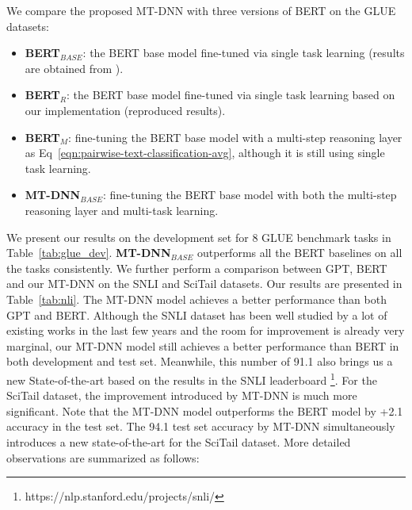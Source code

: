 \iffalse

We compare the proposed MT-DNN with three versions of BERT on the GLUE datasets:
\begin{itemize}
    \item \textbf{BERT}$_{BASE}$: the BERT base model fine-tuned via single task learning (results are obtained from \cite{bert2018}).
    \item \textbf{BERT}$_{R}$: the BERT base model fine-tuned via single task learning based on our implementation (reproduced results).
    \item \textbf{BERT}$_{M}$: fine-tuning the BERT base model with a multi-step reasoning layer as Eq~\ref{eqn:pairwise-text-classification-avg}, although it is still using single task learning.
    \item \textbf{MT-DNN}$_{BASE}$: fine-tuning the BERT base model with both the multi-step reasoning layer and multi-task learning.
\end{itemize}
We present our results on the development set for 8 GLUE benchmark tasks in Table~\ref{tab:glue_dev}. 
\textbf{MT-DNN}$_{BASE}$ outperforms all the BERT baselines on all the tasks consistently. %
We further perform a comparison between GPT, BERT and our MT-DNN on the SNLI and SciTail datasets. Our results are presented in Table~\ref{tab:nli}. The MT-DNN model achieves a better performance than both GPT and BERT. Although the SNLI dataset has been well studied by a lot of existing works in the last few years and the room for improvement is already very marginal, our MT-DNN model still achieves a better performance than BERT in both development and test set. Meanwhile, this number of 91.1 also brings us a new State-of-the-art based on the results in the SNLI leaderboard \footnote{https://nlp.stanford.edu/projects/snli/}.  For the SciTail dataset, the improvement introduced by MT-DNN is much more significant. Note that the MT-DNN model outperforms the BERT model by +2.1 accuracy in the test set. The 94.1 test set accuracy by MT-DNN simultaneously introduces a new state-of-the-art for the SciTail dataset. More detailed observations are summarized as follows:

